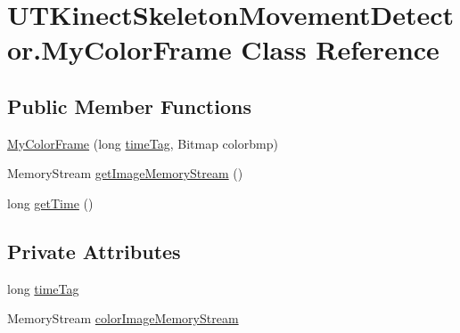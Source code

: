 \hypertarget{classUTKinectSkeletonMovementDetector_1_1MyColorFrame}{\section{U\-T\-Kinect\-Skeleton\-Movement\-Detector.\-My\-Color\-Frame Class Reference}
\label{classUTKinectSkeletonMovementDetector_1_1MyColorFrame}
}
\subsection*{Public Member Functions}
\begin{DoxyCompactItemize}
\item 
\hyperlink{classUTKinectSkeletonMovementDetector_1_1MyColorFrame_a226964f4875f55245058c7980f59f035}{My\-Color\-Frame} (long \hyperlink{classUTKinectSkeletonMovementDetector_1_1MyColorFrame_af4cf6545d2ed2d17b72d585a09e055b4}{time\-Tag}, Bitmap colorbmp)
\item 
Memory\-Stream \hyperlink{classUTKinectSkeletonMovementDetector_1_1MyColorFrame_ad975d56f83d02fe22d3296960421df2a}{get\-Image\-Memory\-Stream} ()
\item 
long \hyperlink{classUTKinectSkeletonMovementDetector_1_1MyColorFrame_af72057adf889b56ee82ca052934f2507}{get\-Time} ()
\end{DoxyCompactItemize}
\subsection*{Private Attributes}
\begin{DoxyCompactItemize}
\item 
long \hyperlink{classUTKinectSkeletonMovementDetector_1_1MyColorFrame_af4cf6545d2ed2d17b72d585a09e055b4}{time\-Tag}
\item 
Memory\-Stream \hyperlink{classUTKinectSkeletonMovementDetector_1_1MyColorFrame_a380ba506814b7d4bc05b4cc47cca4b6b}{color\-Image\-Memory\-Stream}
\end{DoxyCompactItemize}


